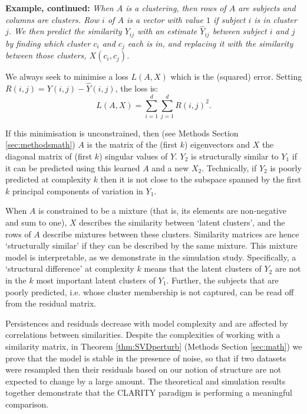 \documentclass[a4]{article}
\newcommand{\+}[1]{\mathbf{#1}}
\begin{document}
\textbf{Example, continued:}  {\it When $A$ is a clustering, then rows of $A$ are subjects and columns are clusters. Row $i$ of $A$ is a vector with value $1$ if subject $i$ is in cluster $j$. We then predict the similarity $Y_{ij}$ with an estimate $\hat{Y}_{ij}$ between subject $i$ and $j$ by finding which cluster $c_i$ and $c_j$ each is in, and replacing it with the similarity between those clusters, $X(c_i,c_j)$.}

We always seek to minimise a loss $L(A,X)$ which is the (squared) error. Setting $R(i,j) = Y(i,j) - \hat{Y}(i,j)$, the loss is:
$$L(A,X) = \sum_{i=1}^d \sum_{j=1}^d R(i,j)^2.$$

If this minimisation is unconstrained, then (see Methods Section \ref{sec:methodsmath}) $A$ is the matrix of the (first $k$) eigenvectors and $X$ the diagonal matrix of (first $k$) singular values of $Y$. $Y_2$ is structurally similar to $Y_1$ if it can be predicted using this learned $A$ and a new $X_2$. Technically, if $Y_2$ is poorly predicted at complexity $k$ then it is not close to the subspace spanned by the first $k$ principal components of variation in $Y_1$.

When $A$ is constrained to be a mixture (that is, its elements are non-negative and sum to one), $X$ describes the similarity between `latent clusters', and the rows of $A$ describe mixtures between these clusters. Similarity matrices are hence `structurally similar' if they can be described by the same mixture.
This mixture model is interpretable, as we demonstrate in the simulation study. Specifically, a `structural difference' at complexity $k$ means that the latent clusters of $Y_2$ are not in the $k$ most important latent clusters of $Y_1$. Further, the subjects that are poorly predicted, i.e. whose cluster membership is not captured, can be read off from the residual matrix.

Persistences and residuals decrease with model complexity and are affected by correlations between similarities.
Despite the complexities of working with a similarity matrix, in Theorem \ref{thm:SVDperturb} (Methods Section \ref{sec:math}) we prove that the model is stable in the presence of noise, so that if two datasets were resampled then their residuals based on our notion of structure are not expected to change by a large amount. The theoretical and simulation results together demonstrate that the CLARITY paradigm is performing a meaningful comparison.
\end{document}
